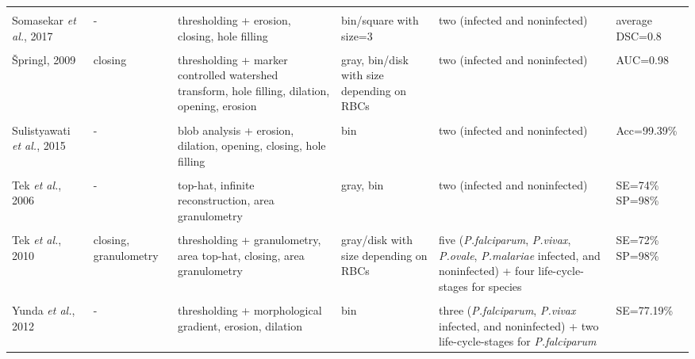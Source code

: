 \begin{longtable}{C{2.1cm} C{2.7cm} C{2.2cm} C{2.0cm} C{2.7cm} C{2.0cm} }
&   &  &  &  & \\
    Somasekar \emph{et al.}, 2017  &
    	- &
    	thresholding + erosion, closing, hole filling  &
    	bin/square with size=3 &
    	two (infected and noninfected) &
    	average DSC=0.8
    \\
&   &  &  &  & \\
{\v{S}}pringl, 2009  &
    	closing &
    	thresholding + marker controlled watershed transform, hole filling, dilation, opening, erosion  &
    	gray, bin/disk with size depending on RBCs &
    	two (infected and noninfected) &
    	AUC=0.98
    \\
&   &  &  &  & \\
    Sulistyawati \emph{et al.}, 2015  &
    	- &
    	blob analysis + erosion, dilation, opening, closing, hole filling  &
    	bin &
    	two (infected and noninfected) &
    	Acc=99.39\%
    \\
&   &  &  &  & \\
 Tek \emph{et al.}, 2006  &
    	- &
    	top-hat, infinite reconstruction, area granulometry  &
    	gray, bin &
    	two (infected and noninfected) &
    	SE=74\% SP=98\%
    \\
&   &  &  &  & \\
    Tek \emph{et al.}, 2010  &
    	closing, granulometry &
    	thresholding + granulometry, area top-hat, closing, area granulometry &
    	gray/disk with size depending on RBCs &
    	five (\emph{P.falciparum}, \emph{P.vivax}, \emph{P.ovale}, \emph{P.malariae} infected, and noninfected) +
    four life-cycle-stages for species &
    	SE=72\% SP=98\%
    \\
&   &  &  &  & \\
    Yunda \emph{et al.}, 2012  &
    	- &
    	thresholding + morphological gradient, erosion, dilation  &
    	bin &
    	three (\emph{P.falciparum}, \emph{P.vivax} infected, and noninfected) + two life-cycle-stages for \emph{P.falciparum}&
    	SE=77.19\% \\
    	  	

\end{longtable}
